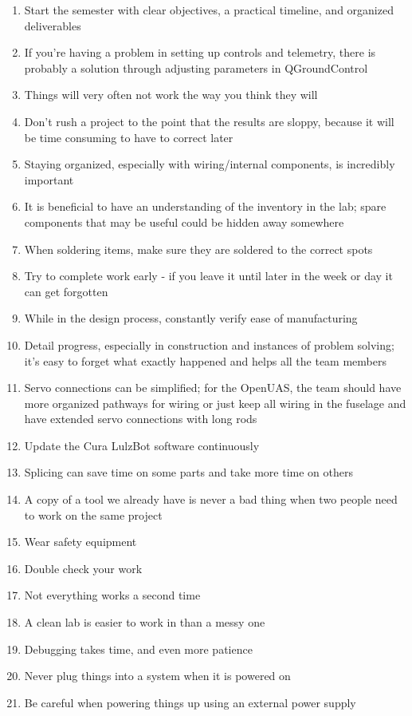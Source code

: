\documentclass{article}
\begin{document}
\begin{enumerate}
\item Start the semester with clear objectives, a practical timeline, and organized deliverables
\item If you're having a problem in setting up controls and telemetry, there is probably a solution through adjusting parameters in QGroundControl
\item Things will very often not work the way you think they will
\item Don't rush a project to the point that the results are sloppy, because it will be time consuming to have to correct later
\item Staying organized, especially with wiring/internal components, is incredibly important
\item It is beneficial to have an understanding of the inventory in the lab; spare components that may be useful could be hidden away somewhere
\item When soldering items, make sure they are soldered to the correct spots
\item Try to complete work early - if you leave it until later in the week or day it can get forgotten
\item While in the design process, constantly verify ease of manufacturing
\item Detail progress, especially in construction and instances of problem solving; it's easy to forget what exactly happened and helps all the team members
\item Servo connections can be simplified; for the OpenUAS, the team should have more organized pathways for wiring or just keep all wiring in the fuselage and have extended servo connections with long rods
\item Update the Cura LulzBot software continuously
\item Splicing can save time on some parts and take more time on others
\item A copy of a tool we already have is never a bad thing when two people need to work on the same project
\item Wear safety equipment 
\item Double check your work
\item Not everything works a second time
\item A clean lab is easier to work in than a messy one
\item Debugging takes time, and even more patience 
\item Never plug things into a system when it is powered on
\item Be careful when powering things up using an external power supply
\end{enumerate}
\end{document}
